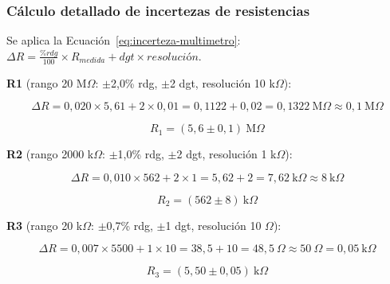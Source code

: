\subsubsection{Cálculo detallado de incertezas de resistencias}
\label{subsubsec:calculo-incertezas-resistencias}

Se aplica la Ecuación~\ref{eq:incerteza-multimetro}: $\Delta R = \frac{\%rdg}{100} \times R_{medida} + dgt \times resolución$.

\textbf{R1} (rango 20 M$\Omega$: $\pm$2{,}0\% rdg, $\pm$2 dgt, resolución 10 k$\Omega$):

\begin{equation}
    \Delta R = 0{,}020 \times 5{,}61 + 2 \times 0{,}01 = 0{,}1122 + 0{,}02 = 0{,}1322 \ \text{M}\Omega \approx 0{,}1 \ \text{M}\Omega
    \label{eq:incerteza-R1}
\end{equation}

\begin{equation}
    \boxed{R_1 = (5{,}6 \pm 0{,}1) \ \text{M}\Omega}
\end{equation}

\textbf{R2} (rango 2000 k$\Omega$: $\pm$1{,}0\% rdg, $\pm$2 dgt, resolución 1 k$\Omega$):

\begin{equation}
    \Delta R = 0{,}010 \times 562 + 2 \times 1 = 5{,}62 + 2 = 7{,}62 \ \text{k}\Omega \approx 8 \ \text{k}\Omega
    \label{eq:incerteza-R2}
\end{equation}

\begin{equation}
    \boxed{R_2 = (562 \pm 8) \ \text{k}\Omega}
\end{equation}

\textbf{R3} (rango 20 k$\Omega$: $\pm$0{,}7\% rdg, $\pm$1 dgt, resolución 10 $\Omega$):

\begin{equation}
    \Delta R = 0{,}007 \times 5500 + 1 \times 10 = 38{,}5 + 10 = 48{,}5 \ \Omega \approx 50 \ \Omega = 0{,}05 \ \text{k}\Omega
    \label{eq:incerteza-R3}
\end{equation}

\begin{equation}
    \boxed{R_3 = (5{,}50 \pm 0{,}05) \ \text{k}\Omega}
\end{equation}


